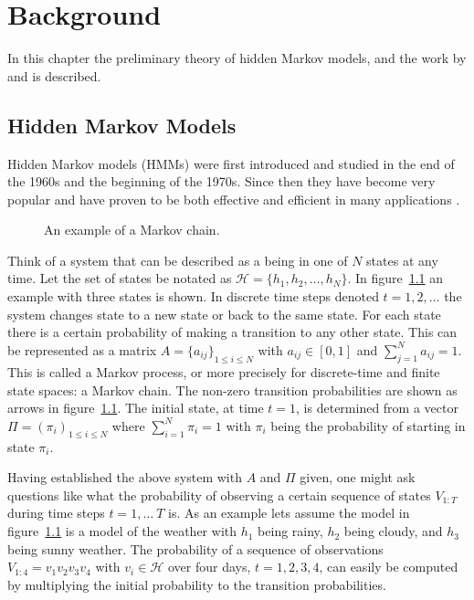 
\chapter{Background}
\label{cha:background}

In this chapter the preliminary theory of hidden Markov models, and
the work by \citet{lifshits2009speeding} and \citet{sand2013ziphmmlib} is
described.

\section{Hidden Markov Models}
\label{sec:hidden-markov-models}

Hidden Markov models (HMMs) were first introduced and
studied in the end of the 1960s and the beginning of the 1970s. Since then they
have become very popular and have proven to be both effective and efficient in
many applications \citep{rabiner1989tutorial}.

\begin{figure}
  \centering
  
  \caption{An example of a Markov chain.}
  \label{fig:markov-chain}
\end{figure}

Think of a system that can be described as a being in one of $N$ states at any
time. Let the set of states be notated as $\mathcal{H} = \{h_1, h_2, \dots, h_N\}$.
In figure~\ref{fig:markov-chain} an example with three states is shown. In
discrete time steps denoted $t = 1, 2, \dots$ the system changes state to a new
state or back to the same state. For each state there is a certain probability
of making a transition to any other state. This can be represented as a matrix
$A = {\{a_{ij}\}}_{1 \le i \le N}$ with $a_{ij} \in [0, 1]$ and
$\sum_{j = 1}^N a_{ij} = 1$. This is called a Markov process, or more precisely
for discrete-time and finite state spaces: a Markov chain. The non-zero
transition probabilities are shown as arrows in
figure~\ref{fig:markov-chain}. The initial state, at time $t = 1$, is
determined from a vector $\Pi = {(\pi_i)}_{1 \le i \le N}$ where
$\sum_{i=1}^N \pi_i = 1$ with $\pi_i$ being the probability of starting in
state $\pi_i$.

Having established the above system with $A$ and $\Pi$ given, one might ask
questions like what the probability of observing a certain sequence of states
$V_{1:T}$ during time steps $t = 1, \dots\ T$ is. As an example lets assume the
model in figure~\ref{fig:markov-chain} is a model of the weather with $h_1$
being rainy, $h_2$ being cloudy, and $h_3$ being sunny weather. The probability
of a sequence of observations $V_{1:4} = v_1v_2v_3v_4$ with
$v_i \in \mathcal{H}$ over four days, $t = 1, 2, 3, 4$, can easily be computed
by multiplying the initial probability to the transition probabilities.

